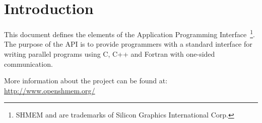 \section{Introduction}

This document defines the elements of the \openshmem  Application Programming
Interface~\footnote{SHMEM and \openshmem  are trademarks of Silicon Graphics International Corp.}.
The purpose of the \openshmem  API is to provide programmers
with a standard interface for writing parallel programs
using C, C++ and Fortran with one-sided communication.

More information about the \openshmem  project can be found at:\\
\url{http://www.openshmem.org/}
